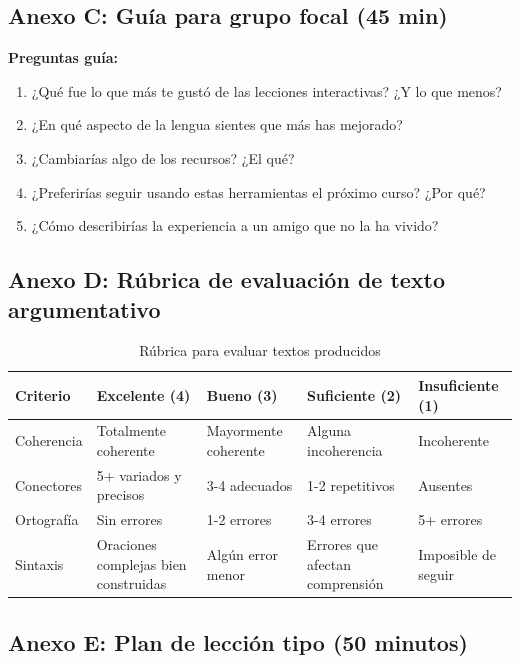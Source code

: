 \documentclass[12pt,spanish]{article}
\begin{document}
\subsection{Anexo C: Guía para grupo focal (45 min)}

\textbf{Preguntas guía:}

\begin{enumerate}
    \item ¿Qué fue lo que más te gustó de las lecciones interactivas? ¿Y lo que menos?
    \item ¿En qué aspecto de la lengua sientes que más has mejorado?
    \item ¿Cambiarías algo de los recursos? ¿El qué?
    \item ¿Preferirías seguir usando estas herramientas el próximo curso? ¿Por qué?
    \item ¿Cómo describirías la experiencia a un amigo que no la ha vivido?
\end{enumerate}

\subsection{Anexo D: Rúbrica de evaluación de texto argumentativo}

\begin{table}[H]
\centering
\caption{Rúbrica para evaluar textos producidos}
\label{tab:rubrica}
\begin{tabular}{|p{3cm}|p{2.5cm}|p{2.5cm}|p{2.5cm}|p{2.5cm}|}
\hline
\textbf{Criterio} & \textbf{Excelente (4)} & \textbf{Bueno (3)} & \textbf{Suficiente (2)} & \textbf{Insuficiente (1)} \\
\hline
Coherencia & Totalmente coherente & Mayormente coherente & Alguna incoherencia & Incoherente \\
\hline
Conectores & 5+ variados y precisos & 3-4 adecuados & 1-2 repetitivos & Ausentes \\
\hline
Ortografía & Sin errores & 1-2 errores & 3-4 errores & 5+ errores \\
\hline
Sintaxis & Oraciones complejas bien construidas & Algún error menor & Errores que afectan comprensión & Imposible de seguir \\
\hline
\end{tabular}
\end{table}

\subsection{Anexo E: Plan de lección tipo (50 minutos)}
\end{document}
